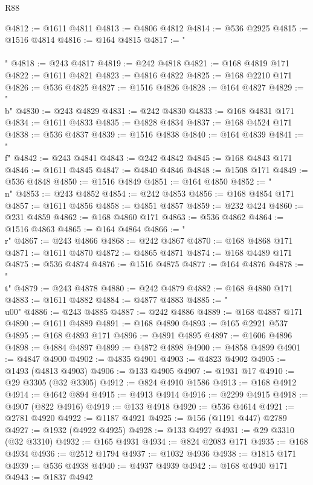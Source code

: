 \begin{lexlean}{R88}
\begin{coremodule}
@4812 := @1611 @4811
@4813 := @4806 @4812
@4814 := @536 @2925
@4815 := @1516 @4814
@4816 := @164 @4815
@4817 := "\\\\"
@4818 := @243 @4817
@4819 := @242 @4818
@4821 := @168 @4819 @171
@4822 := @1611 @4821
@4823 := @4816 @4822
@4825 := @168 @2210 @171
@4826 := @536 @4825
@4827 := @1516 @4826
@4828 := @164 @4827
@4829 := "\\b"
@4830 := @243 @4829
@4831 := @242 @4830
@4833 := @168 @4831 @171
@4834 := @1611 @4833
@4835 := @4828 @4834
@4837 := @168 @4524 @171
@4838 := @536 @4837
@4839 := @1516 @4838
@4840 := @164 @4839
@4841 := "\\f"
@4842 := @243 @4841
@4843 := @242 @4842
@4845 := @168 @4843 @171
@4846 := @1611 @4845
@4847 := @4840 @4846
@4848 := @1508 @171
@4849 := @536 @4848
@4850 := @1516 @4849
@4851 := @164 @4850
@4852 := "\\n"
@4853 := @243 @4852
@4854 := @242 @4853
@4856 := @168 @4854 @171
@4857 := @1611 @4856
@4858 := @4851 @4857
@4859 := @232 @424
@4860 := @231 @4859
@4862 := @168 @4860 @171
@4863 := @536 @4862
@4864 := @1516 @4863
@4865 := @164 @4864
@4866 := "\\r"
@4867 := @243 @4866
@4868 := @242 @4867
@4870 := @168 @4868 @171
@4871 := @1611 @4870
@4872 := @4865 @4871
@4874 := @168 @4489 @171
@4875 := @536 @4874
@4876 := @1516 @4875
@4877 := @164 @4876
@4878 := "\\t"
@4879 := @243 @4878
@4880 := @242 @4879
@4882 := @168 @4880 @171
@4883 := @1611 @4882
@4884 := @4877 @4883
@4885 := "\\u00"
@4886 := @243 @4885
@4887 := @242 @4886
@4889 := @168 @4887 @171
@4890 := @1611 @4889
@4891 := @168 @4890
@4893 := @165 @2921 @537
@4895 := @168 @4893 @171
@4896 := @4891 @4895
@4897 := @1606 @4896
@4898 := @4884 @4897
@4899 := @4872 @4898
@4900 := @4858 @4899
@4901 := @4847 @4900
@4902 := @4835 @4901
@4903 := @4823 @4902
@4905 := @1493 (@4813 @4903)
@4906 := @133 @4905
@4907 := @1931 @17
@4910 := @29 @3305 (@32 @3305)
@4912 := @824 @4910 @1586
@4913 := @168 @4912
@4914 := @4642 @894
@4915 := @4913 @4914
@4916 := @2299 @4915
@4918 := @4907 (@822 @4916)
@4919 := @133 @4918
@4920 := @536 @4614
@4921 := @2781 @4920
@4922 := @1187 @4921
@4925 := @156 (@1191 @447) @2789
@4927 := @1932 (@4922 @4925)
@4928 := @133 @4927
@4931 := @29 @3310 (@32 @3310)
@4932 := @165 @4931
@4934 := @824 @2083 @171
@4935 := @168 @4934
@4936 := @2512 @1794
@4937 := @1032 @4936
@4938 := @1815 @171
@4939 := @536 @4938
@4940 := @4937 @4939
@4942 := @168 @4940 @171
@4943 := @1837 @4942

\end{coremodule}
\end{lexlean}
